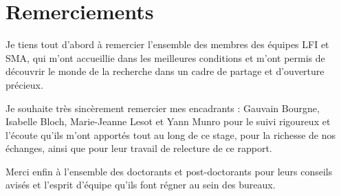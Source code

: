 


\section*{\centering Remerciements}

Je tiens tout d'abord à remercier l'ensemble des membres des équipes LFI et SMA, qui m'ont accueillie dans les meilleures conditions et m'ont permis de découvrir le monde de la recherche dans un cadre de partage et d'ouverture précieux.

Je souhaite très sincèrement remercier mes encadrants : Gauvain Bourgne, Isabelle Bloch, Marie-Jeanne Lesot et Yann Munro pour le suivi rigoureux et l'écoute qu'ils m'ont apportés tout au long de ce stage, pour la richesse de nos échanges, ainsi que pour leur travail de relecture de ce rapport.

Merci enfin à l'ensemble des doctorants et post-doctorants pour leurs conseils avisés et l'esprit d'équipe qu'ils font régner au sein des bureaux.
